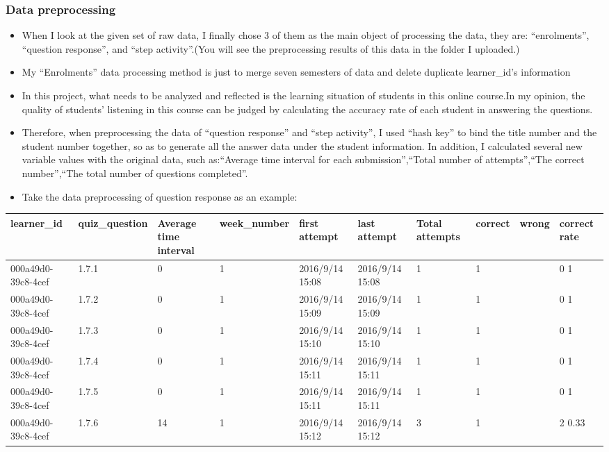 \documentclass[]{article}
\begin{document}
\hypertarget{data-preprocessing}{%
\subsubsection{Data preprocessing}\label{data-preprocessing}}

\begin{itemize}
\item
  When I look at the given set of raw data, I finally chose 3 of them as
  the main object of processing the data, they are: ``enrolments'',
  ``question response'', and ``step activity''.(You will see the
  preprocessing results of this data in the folder I uploaded.)
\item
  My ``Enrolments'' data processing method is just to merge seven
  semesters of data and delete duplicate learner\_id's information 
\item
  In this project, what needs to be analyzed and reflected is the
  learning situation of students in this online course.In my opinion,
  the quality of students' listening in this course can be judged by
  calculating the accuracy rate of each student in answering the
  questions. 
\item
  Therefore, when preprocessing the data of ``question response'' and
  ``step activity'', I used ``hash key'' to bind the title number and
  the student number together, so as to generate all the answer data
  under the student information. In addition, I calculated several new
  variable values with the original data, such as:``Average time
  interval for each submission'',``Total number of attempts'',``The
  correct number'',``The total number of questions completed''.
\item
  Take the data preprocessing of question response as an example: 
\end{itemize}

\begin{longtable}[]{@{}llllllllll@{}}
\toprule
learner\_id & quiz\_question & Average time interval & week\_number &
first attempt & last attempt & Total attempts & correct & wrong &
correct rate\tabularnewline
\midrule
\endhead
000a49d0-39c8-4cef & 1.7.1 & 0 & 1 & 2016/9/14 15:08 & 2016/9/14 15:08 &
1 & 1 & & 0 1\tabularnewline
000a49d0-39c8-4cef & 1.7.2 & 0 & 1 & 2016/9/14 15:09 & 2016/9/14 15:09 &
1 & 1 & & 0 1\tabularnewline
000a49d0-39c8-4cef & 1.7.3 & 0 & 1 & 2016/9/14 15:10 & 2016/9/14 15:10 &
1 & 1 & & 0 1\tabularnewline
000a49d0-39c8-4cef & 1.7.4 & 0 & 1 & 2016/9/14 15:11 & 2016/9/14 15:11 &
1 & 1 & & 0 1\tabularnewline
000a49d0-39c8-4cef & 1.7.5 & 0 & 1 & 2016/9/14 15:11 & 2016/9/14 15:11 &
1 & 1 & & 0 1\tabularnewline
000a49d0-39c8-4cef & 1.7.6 & 14 & 1 & 2016/9/14 15:12 & 2016/9/14 15:12
& 3 & 1 & & 2 0.33\tabularnewline
\bottomrule
\end{longtable}
\end{document}
